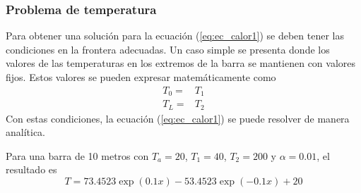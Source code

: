 \begin{frame}
\frametitle{Problema de temperatura}
\end{frame}
\begin{frame}
Para obtener una soluci\'{o}n para la ecuaci\'{o}n (\ref{eq:ec_calor1}) se deben tener las condiciones en la frontera adecuadas. Un caso simple se presenta donde los valores de las temperaturas en los extremos de la barra se mantienen con valores fijos. Estos valores se pueden
expresar matem\'{a}ticamente como
\[ \begin{split} 
T_{0} =& T_{1} \\
T_{L} =& T_{2}
\end{split} \]
Con estas condiciones, la ecuación (\ref{eq:ec_calor1}) se puede resolver de manera anal\'{i}tica.
\end{frame}
\begin{frame}
Para una barra de 10 metros con $T_{a} = 20$, $T_{1} = 40$, $T_{2} = 200$ y $\alpha = 0.01$, el resultado es
\[ T = 73.4523 \exp(0.1x) - 53.4523 \exp (-0.1x) + 20\]
\end{frame}
